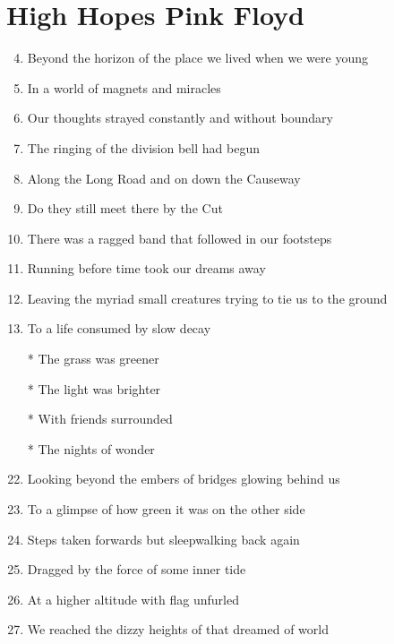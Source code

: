 \documentclass{article}
\begin{document}
    
    \section*{High Hopes \of Pink Floyd }

    \begin{center}
        \begin{enumerate}
            \item[] \intro

            \item[]
            \item[] 
            \item Beyond the horizon of the place we lived when we were young
            \item In a world of magnets and miracles
            \item Our thoughts strayed constantly and without boundary
            \item The ringing of the division bell had begun
            \item Along the Long Road and on down the Causeway
            \item Do they still meet there by the Cut
            \item There was a ragged band that followed in our footsteps
            \item Running before time took our dreams away
            \item Leaving the myriad small creatures trying to tie us to the ground
            \item To a life consumed by slow decay

            \item[]
            \item[] \chorus
            \item[*] The grass was greener
            \item[*] The light was brighter
            \item[*] With friends surrounded
            \item[*] The nights of wonder
            
            \item[]
            \item[] 
            \item Looking beyond the embers of bridges glowing behind us
            \item To a glimpse of how green it was on the other side
            \item Steps taken forwards but sleepwalking back again
            \item Dragged by the force of some inner tide
            \item At a higher altitude with flag unfurled
            \item We reached the dizzy heights of that dreamed of world


\end{enumerate}
\end{center}
\end{document}
